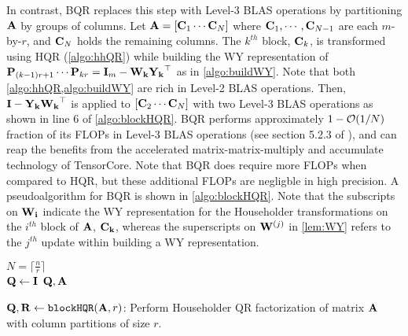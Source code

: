 In contrast, BQR replaces this step with Level-3 BLAS operations by partitioning $\mathbf{A}$ by groups of columns.
Let $\mathbf{A} = [\mathbf{C}_1 \cdots  \mathbf{C}_N]$ where $\mathbf{C}_1,\cdots,\mathbf{C}_{N-1}$ are each $m$-by-$r$, and $\mathbf{C}_N$ holds the remaining columns.
The $k^{th}$ block, $\mathbf{C}_k$, is transformed using HQR (\cref{algo:hhQR}) while building the WY representation of $\mathbf{P}_{(k-1)r+1}\cdots\mathbf{P}_{kr} = \mathbf{I}_m -\mathbf{W_k}\mathbf{Y_k}^{\top}$ as in \cref{algo:buildWY}.
Note that both \cref{algo:hhQR,algo:buildWY} are rich in Level-2 BLAS operations.
Then, $\mathbf{I} -\mathbf{Y_k}\mathbf{W_k}^{\top}$ is applied to $[\mathbf{C}_2 \cdots  \mathbf{C}_N]$ with two Level-3 BLAS operations as shown in line 6 of \cref{algo:blockHQR}.
BQR performs approximately $1-\mathcal{O}(1/N)$ fraction of its FLOPs in Level-3 BLAS operations (see section 5.2.3 of \cite{golub2013matrix}), and can reap the benefits from the accelerated matrix-matrix-multiply and accumulate technology of TensorCore. 
Note that BQR does require more FLOPs when compared to HQR, but these additional FLOPs are negligble in high precision.
A pseudoalgorithm for BQR is shown in \cref{algo:blockHQR}.
Note that the subscripts on $\mathbf{W_i}$ indicate the WY representation for the Householder transformations on the $i^{th}$ block of $\mathbf{A}$, $\mathbf{C_k}$, whereas the superscripts on $\mathbf{W}^{(j)}$ in \cref{lem:WY} refers to the $j^{th}$ update within building a WY representation. 
\begin{algorithm2e}
	\DontPrintSemicolon %
	$N=\lceil \frac{n}{r}\rceil$\\
	$\mathbf{Q}\gets \mathbf{I}$
	\Return $\mathbf{Q},\mathbf{A}$
	\caption{$\mathbf{Q},\mathbf{R}\gets {\tt blockHQR}(\mathbf{A}, r)$: Perform Householder QR factorization of matrix $\mathbf{A}$ with column partitions of size $r$.}
	\label{algo:blockHQR}
\end{algorithm2e}
